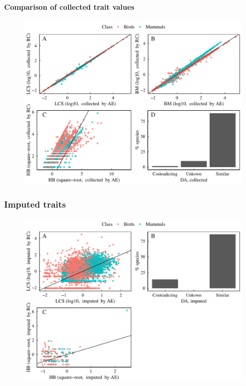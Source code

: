 \paragraph{Comparison of collected trait values}
\begin{figure}[h!]
\centering
\includegraphics[scale=0.7]{figures/chapter2/Comparison_with_RCooke/Comparison_collected.pdf}
\caption[]{}
\label{ComparisonRC_collected}
\end{figure}

\subsubsection{Imputed traits}
\begin{figure}[h!]
\centering
\includegraphics[scale=0.7]{figures/chapter2/Comparison_with_RCooke/Comparison_imputed.pdf}
\caption[]{}
\label{ComparisonRC_imputed}
\end{figure}


